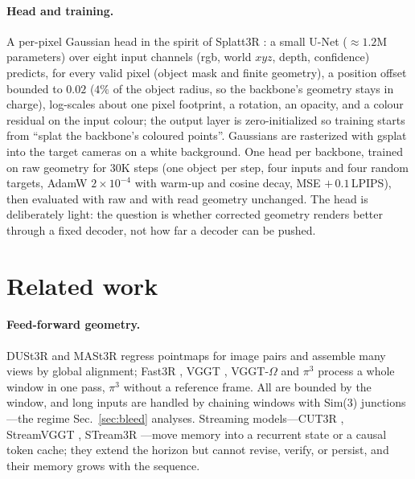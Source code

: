 \paragraph{Head and training.} A per-pixel Gaussian head \citep{kerbl3dgs} in
the spirit of Splatt3R \citep{splatt3r}: a small U-Net (${\approx}1.2$M
parameters) over eight input channels (rgb, world $xyz$, depth, confidence)
predicts, for every valid pixel (object mask and finite geometry), a position
offset bounded to $0.02$ ($4\%$ of the object radius, so the backbone's
geometry stays in charge), log-scales about one pixel footprint, a rotation,
an opacity, and a colour residual on the input colour; the output layer is
zero-initialized so training starts from ``splat the backbone's coloured
points''. Gaussians are rasterized with gsplat into the target cameras on a
white background. One head per backbone, trained on raw geometry for $30$K
steps (one object per step, four inputs and four random targets, AdamW
$2\times10^{-4}$ with warm-up and cosine decay, MSE $+\,0.1\,$LPIPS), then
evaluated with raw and with read geometry unchanged. The head is deliberately
light: the question is whether corrected geometry renders better through a
fixed decoder, not how far a decoder can be pushed.

\section{Related work}
\label{app:related}
\paragraph{Feed-forward geometry.} DUSt3R and MASt3R \citep{dust3r,mast3r}
regress pointmaps for image pairs and assemble many views by global
alignment; Fast3R \citep{fast3r}, VGGT \citep{vggt}, VGGT-$\Omega$
\citep{vggtomega} and $\pi^3$ \citep{pi3} process a whole window in one pass,
$\pi^3$ without a reference frame. All are bounded by the window, and long
inputs are handled by chaining windows with Sim(3) junctions---the regime
Sec.~\ref{sec:bleed} analyses. Streaming models---CUT3R \citep{cut3r},
StreamVGGT \citep{streamvggt}, STream3R \citep{stream3r}---move memory into a
recurrent state or a causal token cache; they extend the horizon but cannot
revise, verify, or persist, and their memory grows with the sequence.

